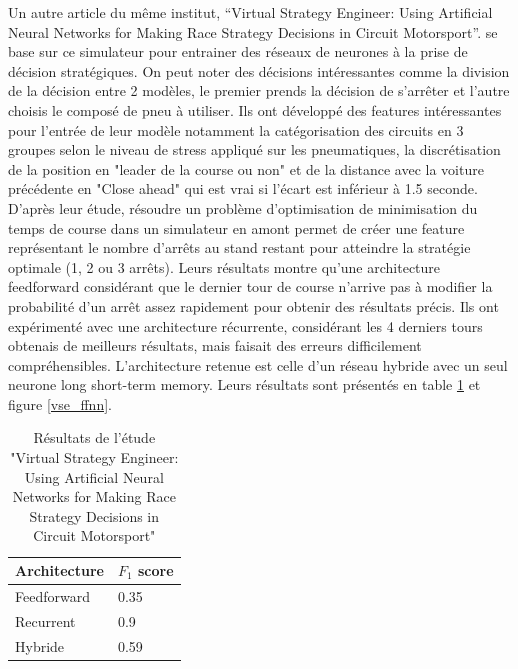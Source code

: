 Un autre article du même institut, “Virtual Strategy Engineer: Using Artificial Neural Networks for Making Race Strategy Decisions in Circuit Motorsport”. \cite{app10217805}
se base sur ce simulateur pour entrainer des réseaux de neurones à la prise de décision stratégiques.
On peut noter des décisions intéressantes comme la division de la décision entre 2 modèles, le premier prends la décision de s’arrêter et l’autre choisis le composé de pneu à utiliser.
Ils ont développé des features intéressantes pour l'entrée de leur modèle notamment la catégorisation des circuits en 3 groupes selon le niveau de stress appliqué sur les pneumatiques,
la discrétisation de la position en "leader de la course ou non" et de la distance avec la voiture précédente en "Close ahead" qui est vrai si l'écart est inférieur à 1.5 seconde.
D'après leur étude, résoudre un problème d'optimisation de minimisation du temps de course dans un simulateur en amont permet de créer une feature
représentant le nombre d'arrêts au stand restant pour atteindre la stratégie optimale (1, 2 ou 3 arrêts).
Leurs résultats montre qu'une architecture feedforward considérant que le dernier tour de course n'arrive pas à modifier la probabilité d'un arrêt assez rapidement pour obtenir des résultats précis.
Ils ont expérimenté avec une architecture récurrente, considérant les 4 derniers tours obtenais de meilleurs résultats, mais faisait des erreurs difficilement compréhensibles.
L'architecture retenue est celle d'un réseau hybride avec un seul neurone long short-term memory. Leurs résultats sont présentés en table \ref{vse_results} et figure \ref{vse_ffnn}.

\begin{table}[H]
    \begin{center}
        \caption{\label{vse_results}Résultats de l'étude "Virtual Strategy Engineer: Using Artificial Neural Networks for Making Race Strategy Decisions in Circuit Motorsport"}
        \begin{tabular}{ll}
            Architecture & $F_1$ score \\ \hline
            Feedforward  & 0.35        \\
            Recurrent    & 0.9         \\
            Hybride      & 0.59
        \end{tabular}
    \end{center}
\end{table}

